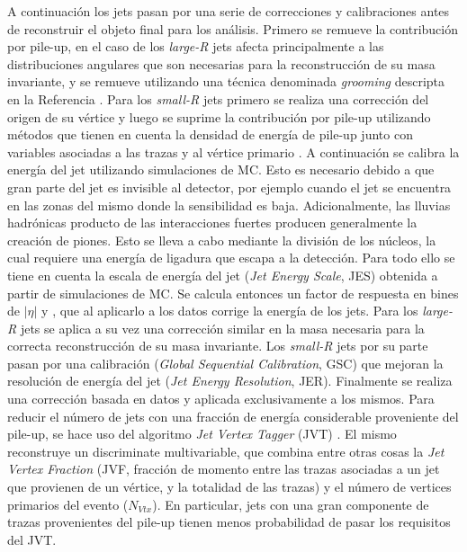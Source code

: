 A continuación los jets pasan por una serie de correcciones y calibraciones antes de reconstruir el objeto final para los análisis. Primero se remueve la contribución por pile-up, en el caso de los \textit{large-R} jets afecta principalmente a las distribuciones angulares que son necesarias para la reconstrucción de su masa invariante, y se remueve utilizando una técnica denominada \textit{grooming} descripta en la Referencia \cite{Krohn_2010}. Para los \textit{small-R} jets primero se realiza una corrección del origen de su vértice y luego se suprime la contribución por pile-up utilizando métodos que tienen en cuenta la densidad de energía de pile-up \cite{PERF-2016-04} junto con variables asociadas a las trazas y al vértice primario \cite{PERF-2014-03}.
A continuación se calibra la energía del jet utilizando simulaciones de MC.
Esto es necesario debido a que gran parte del jet es invisible al detector, por ejemplo cuando el jet se encuentra en las zonas del mismo donde la sensibilidad es baja. 
Adicionalmente, las lluvias hadrónicas producto de las interacciones fuertes producen generalmente la creación de piones. Esto se lleva a cabo mediante la división de los núcleos, la cual requiere una energía de ligadura que escapa a la detección. Para todo ello se tiene en cuenta
la escala de energía del jet (\textit{Jet Energy Scale}, JES) \cite{JETM-2018-05} obtenida a partir de simulaciones de MC. Se calcula entonces un factor de respuesta en bines de $|\eta|$ y \pt, que al aplicarlo a los datos corrige la energía de los jets. Para los \textit{large-R} jets se aplica a su vez una corrección similar en la masa necesaria para la correcta reconstrucción de su masa invariante. Los \textit{small-R} jets por su parte pasan por una calibración (\textit{Global Sequential Calibration}, GSC) que mejoran la resolución de energía del jet (\textit{Jet Energy Resolution}, JER). Finalmente se realiza una corrección basada en datos y aplicada exclusivamente a los mismos.
Para reducir el número de jets con una fracción de energía considerable proveniente del pile-up, se hace uso del algoritmo \textit{Jet Vertex Tagger} (JVT) \cite{ATLAS-CONF-2014-018}. El mismo reconstruye un discriminate multivariable, que combina entre otras cosas la \textit{Jet Vertex Fraction} (JVF, fracción de momento entre las trazas asociadas a un jet que provienen de un vértice, y la totalidad de las trazas) y el número de vertices primarios del evento ($N_{Vtx}$). En particular, jets con una gran componente de trazas provenientes del pile-up tienen menos probabilidad de pasar los requisitos del JVT. 




